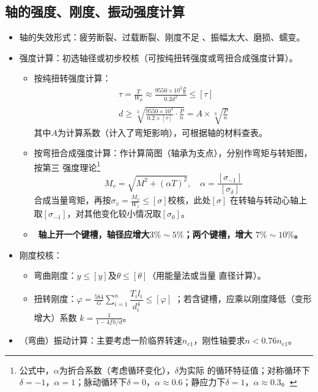 \documentclass[12pt,a4paper]{article}
\newcommand{\tightlist}{\setlength{\parskip}{0pt}\setlength{\itemsep}{0pt}}
\newcommand{\hint}[1]{\textsf{（#1）}}
\newcommand{\minor}[1]{{\color{gray} #1}}
\renewcommand{\emph}[1]{\faIcon[regular]{lightbulb}\ \textbf{#1}}
\begin{document}
\subsection{轴的强度、刚度、振动强度计算}
\begin{itemize}\tightlist
    \item 轴的失效形式：疲劳断裂、过载断裂、刚度不足\minor{、振幅太大、磨损、蠕变}。
    \item 强度计算：初选轴径或初步校核\hint{可按纯扭转强度或弯扭合成强度计算}。
    \begin{itemize}\tightlist
        \item 按纯扭转强度计算：
        \begin{gather}
        \tau=\frac{T}{W_p}\approx\frac{9550\times10^3\frac Pn}{0.2d^3}\leq[\tau]\\
        d\geq\sqrt[3]{\frac{9550\times10^3}{0.2\times[\tau]}\cdot\frac Pn}=A\times
        \sqrt[3]{\frac Pn}
        \end{gather}
        其中$A$为计算系数\hint{计入了弯矩影响}，可根据轴的材料查表。
        \item 按弯扭合成强度计算：作计算简图\hint{轴承为支点}，分别作弯矩与转矩图，按第三
        强度理论\footnote{公式中，$\alpha$为折合系数\hint{考虑循环变化}，$\delta$为实际
        的循环特征值；对称循环下$\delta=-1$，$\alpha=1$；脉动循环下$\delta=0$，$\alpha
        \approx0.6$；静应力下$\delta=1$，$\alpha\approx0.3$。}
        \begin{equation}
        M_v=\sqrt{M^2+(\alpha T)^2},\quad\alpha=\frac{[\sigma_{-1}]}{[\sigma_\delta]}
        \end{equation}
        合成当量弯矩，再按$\sigma_v=\frac{M_v}{W_z}\leq[\sigma]$校核，此处$[\sigma]$
        在转轴与转动心轴上取$[\sigma_{-1}]$，对其他变化较小情况取$[\sigma_0]$。
        \item \emph{轴上开一个键槽，轴径应增大$3\%\sim5\%$；两个键槽，增大
        $7\%\sim10\%$。}
    \end{itemize}
    \item 刚度校核：
    \begin{itemize}\tightlist
        \item \minor{弯曲刚度：$y\leq[y]$及$\theta\leq[\theta]$\hint{用能量法或当量
        直径计算}。}
        \item 扭转刚度：$\varphi=\frac{584}G\sum\limits_{i=1}^n\dfrac{T_il_i}{d_i^4}\leq
        [\varphi]$\minor{；若含键槽，应乘以刚度降低\hint{变形增大}系数
        $k=\frac1{1-4fh/d}$}。
    \end{itemize}
    \item （弯曲）振动计算：主要考虑一阶临界转速$n_{e1}$，刚性轴要求$n<0.76n_{e1}$。
\end{itemize}
\end{document}
